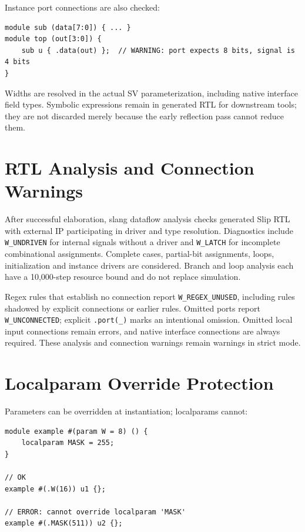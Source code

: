 \documentclass[lang=en,11pt]{elegantbook}
\newcommand{\code}[1]{\texttt{#1}}
\begin{document}
Instance port connections are also checked:

\begin{lstlisting}[language=Slip]
module sub (data[7:0]) { ... }
module top (out[3:0]) {
    sub u { .data(out) };  // WARNING: port expects 8 bits, signal is 4 bits
}
\end{lstlisting}

Widths are resolved in the actual SV parameterization, including native interface
field types. Symbolic expressions remain in generated RTL for downstream tools;
they are not discarded merely because the early reflection pass cannot reduce them.

\section{RTL Analysis and Connection Warnings}

After successful elaboration, slang dataflow analysis checks generated Slip RTL
with external IP participating in driver and type resolution. Diagnostics include
\code{W\_UNDRIVEN} for internal signals without a driver and \code{W\_LATCH} for
incomplete combinational assignments. Complete cases, partial-bit assignments,
loops, initialization and instance drivers are considered. Branch and loop
analysis each have a 10,000-step resource bound and do not replace simulation.

Regex rules that establish no connection report \code{W\_REGEX\_UNUSED}, including
rules shadowed by explicit connections or earlier rules. Omitted ports report
\code{W\_UNCONNECTED}; explicit \code{.port(\_)} marks an intentional omission.
Omitted local input connections remain errors, and native interface connections
are always required. These analysis and connection warnings remain warnings in
strict mode.

\section{Localparam Override Protection}

Parameters can be overridden at instantiation; localparams cannot:

\begin{lstlisting}[language=Slip]
module example #(param W = 8) () {
    localparam MASK = 255;
}

// OK
example #(.W(16)) u1 {};

// ERROR: cannot override localparam 'MASK'
example #(.MASK(511)) u2 {};
\end{lstlisting}
\end{document}
